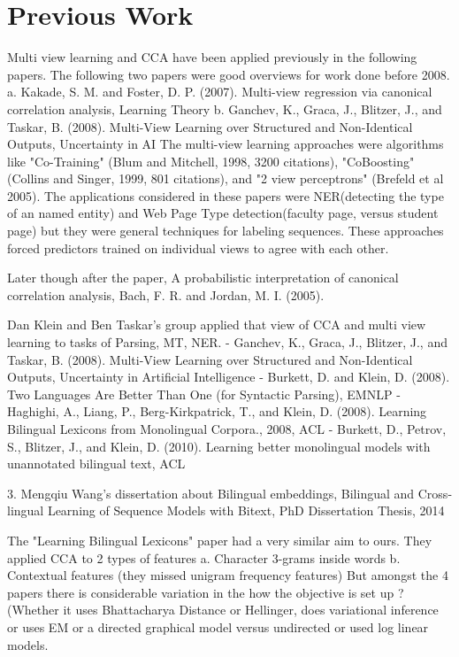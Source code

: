 \documentclass[11pt]{article}
\begin{document}
\section{Previous Work}
Multi view learning and CCA have been applied previously in the following papers.
The following two papers were good overviews for work done before 2008.
a. Kakade, S. M. and Foster, D. P. (2007).  Multi-view regression via canonical correlation analysis, Learning Theory
b. Ganchev, K., Graca, J., Blitzer, J., and Taskar, B. (2008).  Multi-View Learning over Structured and Non-Identical Outputs, Uncertainty in AI
The multi-view learning approaches were algorithms like "Co-Training" (Blum and Mitchell, 1998, 3200 citations), "CoBoosting" (Collins and Singer, 1999, 801 citations), and "2 view perceptrons" (Brefeld et al 2005). The applications considered in these papers were NER(detecting the type of an named entity) and Web Page Type detection(faculty page, versus student page) but they were general techniques for labeling sequences. These approaches forced predictors trained on individual views to agree with each other. 

Later though after the paper, A probabilistic interpretation of canonical correlation analysis, Bach, F. R. and Jordan, M. I. (2005). 


Dan Klein and Ben Taskar's group applied that view of CCA and multi view learning to tasks of Parsing, MT, NER. 
- Ganchev, K., Graca, J., Blitzer, J., and Taskar, B. (2008).  Multi-View Learning over Structured and Non-Identical Outputs, Uncertainty in Artificial Intelligence
- Burkett, D. and Klein, D. (2008).  Two Languages Are Better Than One (for Syntactic Parsing), EMNLP
- Haghighi, A., Liang, P., Berg-Kirkpatrick, T., and Klein, D. (2008).  Learning Bilingual Lexicons from Monolingual Corpora., 2008, ACL
- Burkett, D., Petrov, S., Blitzer, J., and Klein, D. (2010).  Learning better monolingual models with unannotated bilingual text, ACL

3. Mengqiu Wang's dissertation about Bilingual embeddings, Bilingual and Cross-lingual Learning of Sequence Models with Bitext, PhD Dissertation Thesis, 2014

The "Learning Bilingual Lexicons"  paper had a very similar aim to ours. They applied CCA to 2 types of features
a. Character 3-grams inside words 
b. Contextual features (they missed unigram frequency features)
But amongst the 4 papers there is considerable variation in the how the objective is set up ? (Whether it uses Bhattacharya Distance or Hellinger, does variational inference or uses EM or a directed graphical model versus undirected or used log linear models.
\end{document}
